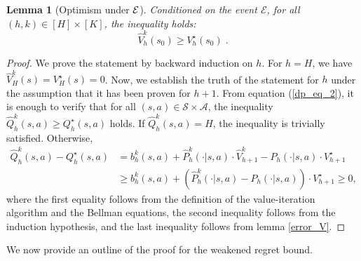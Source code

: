 \documentclass{article}
\numberwithin{equation}{section}
\newtheorem{lemma}{Lemma}
\newcommand{\eqsp}{\;}
\begin{document}
\begin{lemma}[Optimism under \(\cal{E}\)]
    Conditioned on the event \( \mathcal{E} \), for all \( (h,k) \in [H]\times[K] \), the inequality holds:
    \[\widehat{V}_h^k(s_0) \geq V_h^{\star}(s_0)\eqsp.\]
\end{lemma}

\begin{proof}
    We prove the statement by backward induction on \( h \). For \( h = H \), we have \( \widehat{V}_H^k(s) = V_H^{\star}(s) = 0 \).
    Now, we establish the truth of the statement for \( h \) under the assumption that it has been proven for \( h + 1 \). From equation (\ref{dp_eq_2}), it is enough to verify that for all \( (s,a) \in \mathcal{S} \times \mathcal{A} \), the inequality \( \widehat{Q}_h^k(s,a) \geq Q_h^{\star}(s,a) \) holds. If \( \widehat{Q}_h^k(s,a) = H \), the inequality is trivially satisfied.
 Otherwise,
    \begin{align*}
        \widehat{Q}_h^k(s,a) - Q_h^{\star}(s,a) &= b_h^k(s,a) +  \widehat{P}_h^k(\cdot|s,a) \cdot \widehat{V}_{h+1}^{k} - P_h(\cdot|s,a)\cdot V_{h+1}^{\star} \\
        &\geq  b_h^k(s,a) +  (\widehat{P}_h^k(\cdot|s,a) - P_h(\cdot|s,a)) \cdot V_{h+1}^{\star} \geq 0,
    \end{align*}
    where the first equality follows from the definition of the value-iteration algorithm and the Bellman equations, the second inequality follows from the induction hypothesis, and the last inequality follows from lemma \ref{error_V}.
\end{proof}
We now provide an outline of the proof for the weakened regret bound.
\end{document}

